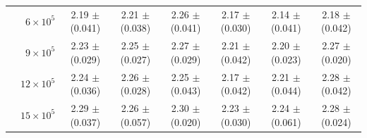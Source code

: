\documentclass[10pt,journal,compsoc]{IEEEtran}
\begin{document}
\begin{table}
\begin{tabular}{c|r|c|c|c|c|c|c}
 & $6 \times 10^5 $  & 2.19 $\pm$ (0.041) & 2.21 $\pm$ (0.038) & 2.26 $\pm$ (0.041) & 2.17 $\pm$ (0.030) & 2.14 $\pm$ (0.041) & 2.18 $\pm$ (0.042)  \\
 & $9 \times 10^5 $  & 2.23 $\pm$ (0.029) & 2.25 $\pm$ (0.027) & 2.27 $\pm$ (0.029) & 2.21 $\pm$ (0.042) & 2.20 $\pm$ (0.023) & 2.27 $\pm$ (0.020)  \\
 & $12 \times 10^5 $ & 2.24 $\pm$ (0.036) & 2.26 $\pm$ (0.028) & 2.25 $\pm$ (0.043) & 2.17 $\pm$ (0.042) & 2.21 $\pm$ (0.044) & 2.28 $\pm$ (0.042)  \\
 & $15 \times 10^5 $ & 2.29 $\pm$ (0.037) & 2.26 $\pm$ (0.057) & 2.30 $\pm$ (0.020) & 2.23 $\pm$ (0.030) & 2.24 $\pm$ (0.061) & 2.28 $\pm$ (0.024) \\
\hline \hline
\end{tabular}
\vspace{-2ex}
\end{table}
\end{document}
